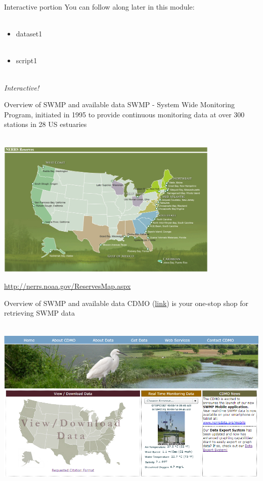 \documentclass[xcolor=svgnames]{beamer}\usepackage[]{graphicx}\usepackage[]{color}
\begin{document}
\begin{frame}{Interactive portion}
You can follow along later in this module: \\~\\
\begin{itemize}
\item dataset1\\~\\
\item script1 \\~\\
\end{itemize}
\Large
\centerline{\emph{Interactive!}}
\end{frame}

\begin{frame}{Overview of SWMP and available data}
SWMP - System Wide Monitoring Program, initiated in 1995 to provide continuous monitoring data at over 300 stations in 28 US estuaries \\~\\
\centerline{\includegraphics[width = 0.8\textwidth]{imgs/NERRS_locations.png}}
\tiny
\flushright
\href{http://nerrs.noaa.gov/ReservesMap.aspx}{http://nerrs.noaa.gov/ReservesMap.aspx}
\end{frame}

\begin{frame}[t]{Overview of SWMP and available data}
CDMO (\href{http://cdmo.baruch.sc.edu/}{link}) is your one-stop shop for retrieving SWMP data \\~\\
\centerline{\includegraphics[width = \textwidth]{imgs/cdmo_front.png}}
\end{frame}
\end{document}
